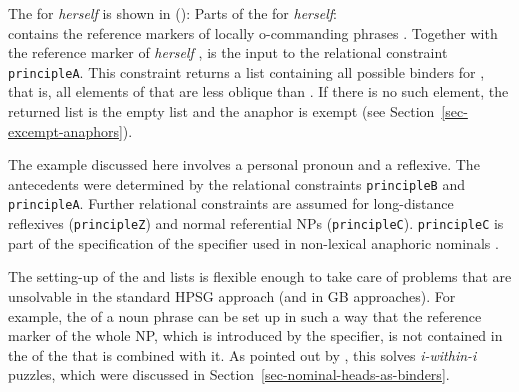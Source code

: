 \documentclass[output=paper,biblatex,babelshorthands,newtxmath,draftmode,colorlinks,citecolor=brown]{langscibook}
\begin{document}
The \synsemv for \emph{herself} is shown in ():
\eas
Parts of the \synsemv for \emph{herself}:\\
\zs
\lista contains the reference markers of locally o-commanding phrases . Together with the
reference marker of \emph{herself} ,  is the input to the relational constraint
\texttt{principleA}. This constraint returns a list containing all possible binders for ,
that is, all elements of  that are less oblique than . If there is no such element,
the returned list is the empty list and the anaphor is exempt (see Section~\ref{sec-excempt-anaphors}).

The example discussed here involves a personal pronoun and a reflexive. The antecedents were
determined by the relational constraints \texttt{principleB} and \texttt{prin\-cipleA}. Further
relational constraints are assumed for long-distance reflexives (\texttt{principleZ}) and normal
referential NPs (\texttt{principleC}). \texttt{principleC} is part of the specification of the
specifier used in non-lexical anaphoric nominals \citep[]{Branco2002a}.

The setting-up of the \lista and \listu lists is flexible enough to take care of problems that are
unsolvable in the standard HPSG approach (and in GB approaches). For example, the \listul of a noun
phrase can be set up in such a way that the reference marker of the whole NP, which is introduced by
the specifier, is not contained in the \listul of the \nbar that is combined with it. As pointed out
by \citet[]{Branco2002a}, this solves \emph{i-within-i} puzzles, which were discussed in Section~\ref{sec-nominal-heads-as-binders}.
\end{document}
